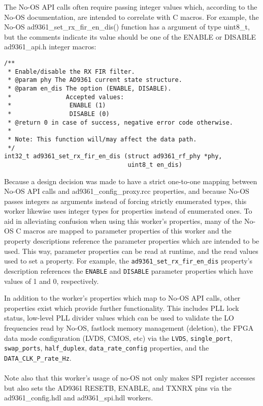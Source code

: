 \documentclass{article}
\def\comp{ad9361\_config\_proxy}
\begin{document}
\noindent
The No-OS API calls often require passing integer values which, according to the No-OS documentation, are intended to correlate with C macros. For example, the No-OS ad9361\_set\_rx\_fir\_en\_dis() function has a argument of type uint8\_t, but the comments indicate its value should be one of the ENABLE or DISABLE ad9361\_api.h integer macros:
\begin{lstlisting}
/**
 * Enable/disable the RX FIR filter.
 * @param phy The AD9361 current state structure.
 * @param en_dis The option (ENABLE, DISABLE).
 *               Accepted values:
 *                ENABLE (1)
 *                DISABLE (0)
 * @return 0 in case of success, negative error code otherwise.
 *
 * Note: This function will/may affect the data path.
 */
int32_t ad9361_set_rx_fir_en_dis (struct ad9361_rf_phy *phy,
                                  uint8_t en_dis)
\end{lstlisting}
\begin{sloppypar}
\noindent
Because a design decision was made to have a strict one-to-one mapping between No-OS API calls and \comp{}.rcc properties, and because No-OS passes integers as arguments instead of forcing strictly enumerated types, this worker likewise uses integer types for properties instead of enumerated ones. To aid in alleviating confusion when using this worker's properties, many of the No-OS C macros are mapped to parameter properties of this worker and the property descriptions reference the parameter properties which are intended to be used. This way, parameter properties can be read at runtime, and the read values used to set a property. For example, the \verb+ad9361_set_rx_fir_en_dis+ property's description references the \verb+ENABLE+ and \verb+DISABLE+ parameter properties which have values of 1 and 0, respectively. \\
\end{sloppypar}
In addition to the worker's properties which map to No-OS API calls, other properties exist which provide further functionality. This includes PLL lock status, low-level PLL divider values which can be used to validate the LO frequencies read by No-OS, fastlock memory management (deletion), the FPGA data mode configuration (LVDS, CMOS, etc) via the \verb+LVDS+, \verb+single_port+, \verb+swap_ports+, \verb+half_duplex+, \verb+data_rate_config+ properties, and the \verb+DATA_CLK_P_rate_Hz+.\\ \\
Note also that this worker's usage of no-OS not only makes SPI register accesses but also sets the AD9361 RESETB, ENABLE, and TXNRX pins via the ad9361\_config.hdl\cite{config_comp_datasheet} and ad9361\_spi.hdl\cite{spi_comp_datasheet} workers.
\end{document}
